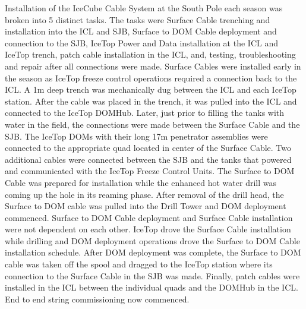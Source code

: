 Installation of the IceCube Cable System at the South Pole each season was
broken into 5 distinct tasks. The tasks were Surface Cable trenching and
installation into the ICL and SJB, Surface to DOM Cable deployment and
connection to the SJB, IceTop Power and Data installation at the ICL and
IceTop trench, patch cable installation in the ICL, and, testing,
troubleshooting and repair after all connections were made. Surface Cables
were installed early in the season as IceTop freeze control operations
required a connection back to the ICL. A 1m deep trench was mechanically
dug between the ICL and each IceTop station. After the cable was placed in
the trench, it was pulled into the ICL and connected to the IceTop
DOMHub. Later, just prior to filling the tanks with water in the field, the
connections were made between the Surface Cable and the SJB. The IceTop
DOMs with their long 17m penetrator assemblies were connected to the
appropriate quad located in center of the Surface Cable. Two additional
cables were connected between the SJB and the tanks that powered and
communicated with the IceTop Freeze Control Units. The Surface to DOM Cable
was prepared for installation while the enhanced hot water drill was coming
up the hole in its reaming phase. After removal of the drill head, the
Surface to DOM cable was pulled into the Drill Tower and DOM deployment
commenced. Surface to DOM Cable deployment and Surface Cable installation
were not dependent on each other. IceTop drove the Surface Cable
installation while drilling and DOM deployment operations drove the Surface
to DOM Cable installation schedule. After DOM deployment was complete, the
Surface to DOM cable was taken off the spool and dragged to the IceTop
station where its connection to the Surface Cable in the SJB was
made. Finally, patch cables were installed in the ICL between the
individual quads and the DOMHub in the ICL. End to end string commissioning
now commenced.
 
